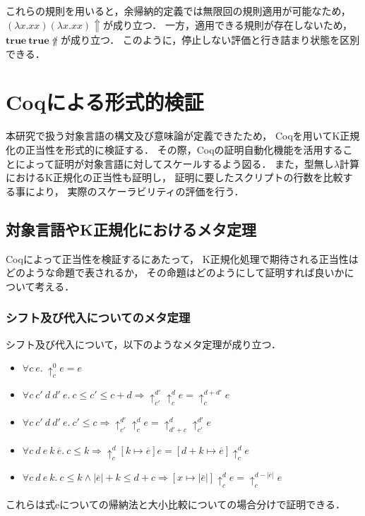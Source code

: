 \documentclass[T]{compsoft}
\newcommand{\keyword}[1]{\mathbf{#1}}
\newcommand{\TRUE}{\keyword{true}}
\begin{document}
これらの規則を用いると，余帰納的定義では無限回の規則適用が可能なため，
$(\lambda x.x x)(\lambda x.x x) \Uparrow$が成り立つ．
一方，適用できる規則が存在しないため，$\TRUE~\TRUE \not \Uparrow$が成り立つ．
このように，停止しない評価と行き詰まり状態を区別できる．

\section{Coqによる形式的検証}
本研究で扱う対象言語の構文及び意味論が定義できたため，
Coqを用いてK正規化の正当性を形式的に検証する．
その際，Coqの証明自動化機能を活用することによって証明が対象言語に対してスケールするよう図る．
また，型無し$\lambda$計算におけるK正規化の正当性も証明し，
証明に要したスクリプトの行数を比較する事により，
実際のスケーラビリティの評価を行う．

\subsection{対象言語やK正規化におけるメタ定理}
Coqによって正当性を検証するにあたって，
K正規化処理で期待される正当性はどのような命題で表されるか，
その命題はどのようにして証明すれば良いかについて考える．

\subsubsection{シフト及び代入についてのメタ定理}
シフト及び代入について，以下のようなメタ定理が成り立つ．
\begin{itemize}
	\item $\forall c~e.~\uparrow^0_c e = e$
	\item $\forall c~c'~d~d'~e.~c \leq c' \leq c + d \Longrightarrow \uparrow^{d'}_{c'} \uparrow^d_c e = \uparrow^{d+d'}_c e$
	\item $\forall c~c'~d~d'~e.~c' \leq c \Longrightarrow \uparrow^{d'}_{c'} \uparrow^d_c e = \uparrow^{d}_{d'+ c} \uparrow^{d'}_{c'} e$
	\item $\forall c~d~e~k~\overline{e}.~c \leq k \Longrightarrow \uparrow^d_c [k \mapsto \overline{e}] e = [d + k \mapsto \overline{e}] \uparrow^d_c e$
	\item $\forall c~d~e~k.~c \leq k \land |\overline{e}| + k \leq d + c \Longrightarrow [x \mapsto |\overline{e}| ] \uparrow^d_c e = \uparrow^{d-|\overline{e}|}_c e$
\end{itemize}

これらは式eについての帰納法と大小比較についての場合分けで証明できる．
\end{document}
